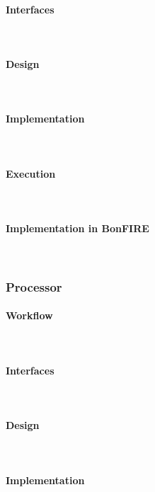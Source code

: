 \paragraph{Interfaces}~\\

\paragraph{Design}~\\


\paragraph{Implementation}~\\

\paragraph{Execution}~\\

\paragraph{Implementation in BonFIRE}~\\

\subsubsection{Processor}

\paragraph{Workflow}~\\

\paragraph{Interfaces}~\\

\paragraph{Design}~\\


\paragraph{Implementation}~\\

